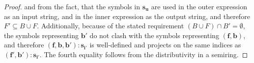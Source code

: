 \begin{proof}
    and from the fact, that the symbols in $\bm{s_u}$ are used in the outer expression as an input string, and in the inner expression as the output string, and therefore $F' \subseteq B \cup F$.
    Additionally, because of the stated requirement $(B \cup F) \cap B' = \emptyset$, the symbols representing $\bm{b'}$ do not clash with the symbols representing $(\bm{f}, \bm{b})$, and therefore $(\bm{f}, \bm{b}, \bm{b'}):\bm{s_{i'}}$ is well-defined and projects on the same indices as $(\bm{f'}, \bm{b'}):\bm{s_{i'}}$.
    The fourth equality follows from the distributivity in a semiring.
\end{proof}
\bigskip